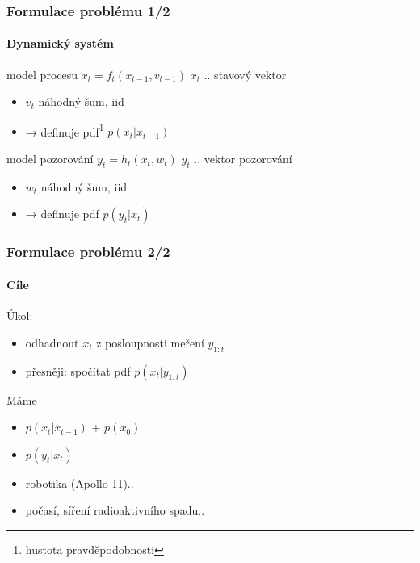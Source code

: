 \documentclass[12pt]{beamer}
\begin{document}
\begin{frame}
	\frametitle{Formulace problému 1/2}
	\framesubtitle{Dynamický systém}

	\begin{block}{model procesu}
		\(x_t = f_t(x_{t-1}, v_{t-1})\) \hspace{3cm} \(x_t\) .. stavový vektor

		\begin{itemize}
		\item \(v_t\) náhodný šum, iid
		\item → definuje pdf\footnote{hustota pravděpodobnosti} \(p(x_t|x_{t-1})\)
		\end{itemize}
	\end{block}

	\begin{block}{model pozorování}
		\(y_t = h_t(x_t, w_t)\) \hspace{3cm} \(y_t\) .. vektor pozorování

		\begin{itemize}
		\item \(w_t\) náhodný šum, iid
		\item → definuje pdf \(p(y_t|x_t)\)
		\end{itemize}
	\end{block}
\end{frame}

\begin{frame}
	\frametitle{Formulace problému 2/2}
	\framesubtitle{Cíle}

	{\large Úkol:
	\begin{itemize}
		\item odhadnout \(x_t\) z posloupnosti meření \(y_{1:t}\)
		\item přesněji: spočítat pdf \(p(x_t | y_{1:t})\)
	\end{itemize}
	}

	\begin{block}{Máme}
		\begin{itemize}
			\item \(p(x_t|x_{t-1})\) \hspace{1cm} + \(p(x_0)\)
			\item \(p(y_t|x_t)\)
		\end{itemize}
	\end{block}

	\begin{example}
		\begin{itemize}
			\item robotika (Apollo 11)..
			\item počasí, síření radioaktivního spadu..
		\end{itemize}
	\end{example}
\end{frame}
\end{document}
